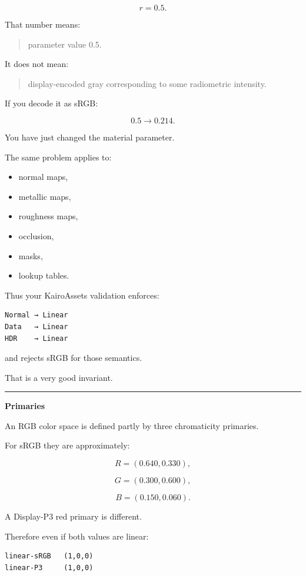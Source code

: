\[
r=0.5.
\]

That number means:

\begin{quote}
parameter value 0.5.
\end{quote}

It does not mean:

\begin{quote}
display-encoded gray corresponding to some radiometric intensity.
\end{quote}

If you decode it as sRGB:

\[
0.5\rightarrow0.214.
\]

You have just changed the material parameter.

The same problem applies to:

\begin{itemize}
\tightlist
\item
  normal maps,
\item
  metallic maps,
\item
  roughness maps,
\item
  occlusion,
\item
  masks,
\item
  lookup tables.
\end{itemize}

Thus your KairoAssets validation enforces:

\begin{verbatim}
Normal → Linear
Data   → Linear
HDR    → Linear
\end{verbatim}

and rejects sRGB for those semantics.

That is a very good invariant.

\begin{center}\rule{0.5\linewidth}{0.5pt}\end{center}

\textbf{Primaries}

An RGB color space is defined partly by three chromaticity primaries.

For sRGB they are approximately:

\[
R=(0.640,0.330),
\]

\[
G=(0.300,0.600),
\]

\[
B=(0.150,0.060).
\]

A Display-P3 red primary is different.

Therefore even if both values are linear:

\begin{verbatim}
linear-sRGB   (1,0,0)
linear-P3     (1,0,0)
\end{verbatim}

